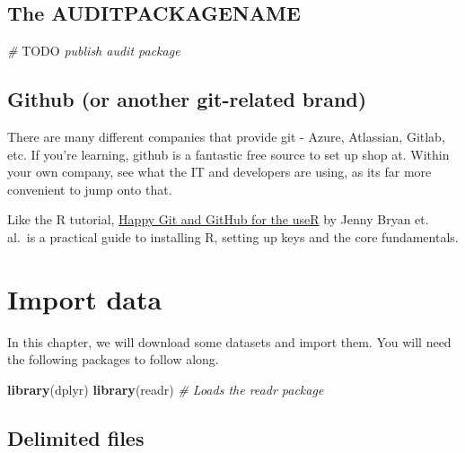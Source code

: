 \documentclass[
]{book}
\newenvironment{Shaded}{\begin{snugshade}}{\end{snugshade}}
\newcommand{\AlertTok}[1]{\textcolor[rgb]{0.94,0.16,0.16}{#1}}
\newcommand{\CommentTok}[1]{\textcolor[rgb]{0.56,0.35,0.01}{\textit{#1}}}
\newcommand{\KeywordTok}[1]{\textcolor[rgb]{0.13,0.29,0.53}{\textbf{#1}}}
\newcommand{\NormalTok}[1]{#1}
\begin{document}
\hypertarget{the-auditpackagename}{%
\section{The AUDITPACKAGENAME}\label{the-auditpackagename}}

\begin{Shaded}
\begin{Highlighting}[]
\CommentTok{# }\AlertTok{TODO}\CommentTok{ publish audit package}
\end{Highlighting}
\end{Shaded}

\hypertarget{github-or-another-git-related-brand}{%
\section{Github (or another git-related brand)}\label{github-or-another-git-related-brand}}

There are many different companies that provide git - Azure, Atlassian, Gitlab, etc. If you're learning, github is a fantastic free source to set up shop at. Within your own company, see what the IT and developers are using, as its far more convenient to jump onto that.

Like the R tutorial, \href{https://happygitwithr.com}{Happy Git and GitHub for the useR} by Jenny Bryan et. al.~is a practical guide to installing R, setting up keys and the core fundamentals.

\hypertarget{import-data}{%
\chapter{Import data}\label{import-data}}

In this chapter, we will download some datasets and import them. You will need the following packages to follow along.

\begin{Shaded}
\begin{Highlighting}[]
\KeywordTok{library}\NormalTok{(dplyr)}
\KeywordTok{library}\NormalTok{(readr) }\CommentTok{# Loads the readr package}
\end{Highlighting}
\end{Shaded}

\hypertarget{delimited-files}{%
\section{Delimited files}\label{delimited-files}}
\end{document}
